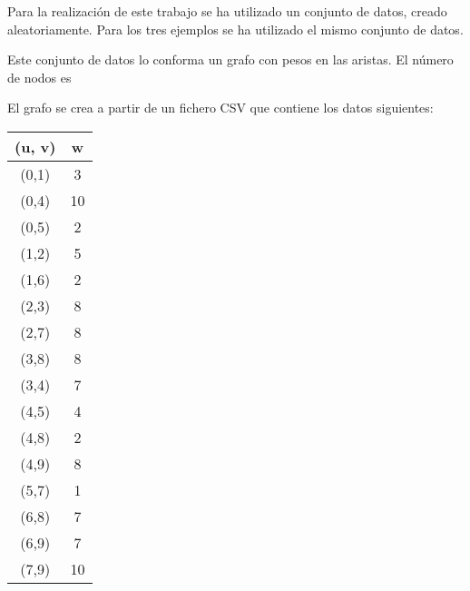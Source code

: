 Para la realización de este trabajo se ha utilizado un conjunto de datos, creado aleatoriamente. Para los tres ejemplos se ha utilizado el mismo conjunto de datos.

Este conjunto de datos lo conforma un grafo con pesos en las aristas. El número de nodos es 

El grafo se crea a partir de un fichero CSV que contiene los datos siguientes:

\begin{center}
	\begin{tabular}{ |c|c| } 
		(u, v) & w \\ 
		\hline
		(0,1) & 3 \\
		(0,4) & 10 \\
		(0,5) & 2 \\
		(1,2) & 5 \\
		(1,6) & 2 \\
		(2,3) & 8 \\
		(2,7) & 8 \\
		(3,8) & 8 \\
		(3,4) & 7 \\
		(4,5) & 4 \\
		(4,8) & 2 \\
		(4,9) & 8 \\
		(5,7) & 1 \\
		(6,8) & 7 \\
		(6,9) & 7 \\
		(7,9) & 10 \\
		\hline
	\end{tabular}
\end{center}